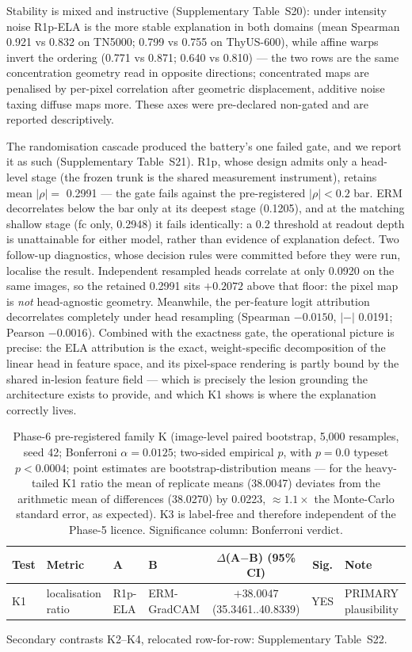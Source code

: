 \documentclass[jimh,article,submit,moreauthors,pdftex]{Definitions/tsp}
\begin{document}
Stability is mixed and instructive (Supplementary Table~S20): under
intensity noise R1p-ELA is the more stable explanation in both domains
(mean Spearman 0.921 vs 0.832 on TN5000; 0.799 vs 0.755 on ThyUS-600),
while affine warps invert the ordering (0.771 vs 0.871; 0.640 vs
0.810) --- the two rows are the same concentration geometry read in
opposite directions; concentrated maps are penalised by per-pixel
correlation after geometric displacement, additive noise taxing
diffuse maps more. These axes were pre-declared non-gated and are
reported descriptively.

The randomisation cascade produced the battery's one failed gate, and
we report it as such (Supplementary Table~S21). R1p, whose design
admits only a head-level stage (the frozen trunk is the shared
measurement instrument), retains mean $|\rho|{=}$ 0.2991 --- the gate
fails against the pre-registered $|\rho|{<}0.2$ bar. ERM decorrelates
below the bar only at its deepest stage (0.1205), and at the matching
shallow stage (fc only, 0.2948) it fails identically: a 0.2 threshold
at readout depth is unattainable for either model, rather than evidence
of explanation defect. Two follow-up diagnostics, whose decision rules
were committed before they were run, localise the result. Independent
resampled heads correlate at only 0.0920 on the same images, so the
retained 0.2991 sits $+0.2072$ above that floor: the pixel map is
\emph{not} head-agnostic geometry. Meanwhile, the per-feature logit
attribution decorrelates completely under head resampling (Spearman
$-0.0150$, $|{-}|$ 0.0191; Pearson $-0.0016$). Combined with the exactness gate, the operational picture
is precise: the ELA attribution is the exact, weight-specific
decomposition of the linear head in feature space, and its pixel-space
rendering is partly bound by the shared in-lesion feature field ---
which is precisely the lesion grounding the architecture exists to
provide, and which K1 shows is where the explanation correctly lives.

\begin{table}[!ht]
\centering\scriptsize
\caption{Phase-6 pre-registered family K (image-level paired bootstrap,
5{,}000 resamples, seed 42; Bonferroni $\alpha{=}0.0125$; two-sided
empirical $p$, with $p{=}0.0$ typeset $p{<}0.0004$; point estimates are
bootstrap-distribution means --- for the heavy-tailed K1 ratio the mean
of replicate means (38.0047) deviates from the arithmetic mean of
differences (38.0270) by 0.0223, ${\approx}1.1\times$ the Monte-Carlo
standard error, as expected). K3 is label-free and therefore independent
of the Phase-5 licence. Significance column: Bonferroni verdict.}
\label{tab:phase6_familyk}
\begin{tabular}{llllccl}
\toprule
Test & Metric & A & B & $\Delta$(A$-$B) (95\% CI) & Sig. & Note \\
\midrule
K1 & localisation ratio & R1p-ELA & ERM-GradCAM & $+38.0047$ (35.3461..40.8339) & YES & PRIMARY plausibility \\
\bottomrule
\end{tabular}

{\footnotesize Secondary contrasts K2--K4, relocated row-for-row: Supplementary Table~S22.}
\end{table}
\end{document}
